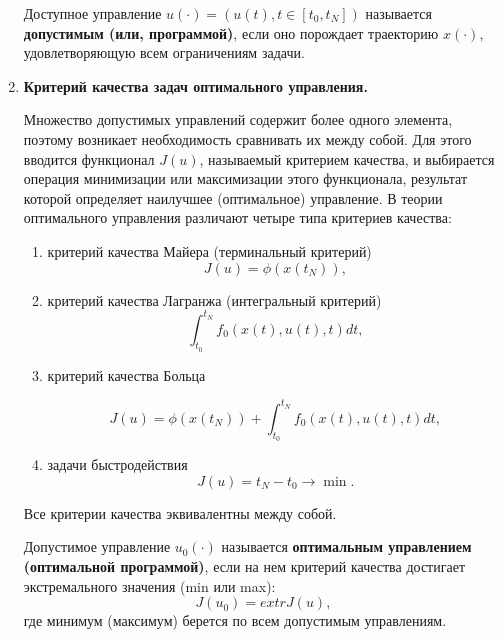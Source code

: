 \begin{enumerate}
Доступное управление $u(·) = (u(t), t \in [t_0 , t_N ])$ называется \textbf{допустимым (или, программой)}, если оно порождает траекторию $x(·)$, удовлетворяющую всем ограничениям задачи.
    
    
    \item \textbf{Критерий качества задач оптимального управления.}

 Множество допустимых управлений  содержит более одного элемента, поэтому возникает необходимость сравнивать их между собой. Для этого вводится функционал $J(u)$, называемый критерием качества, и выбирается операция минимизации или максимизации этого функционала, результат которой определяет наилучшее (оптимальное) управление. В теории оптимального управления различают четыре типа критериев качества:
\begin{enumerate}
    \item критерий качества Майера (терминальный критерий)
    \begin{equation} \label{eq_op:Mayers} J(u) = \phi(x(t_N)),
    \end{equation}
    \item критерий качества Лагранжа (интегральный критерий)
    \begin{equation} \label{eq_op:Lagranzh} \int_{t_0}^{t_N}f_0(x(t),u(t),t)dt,
    \end{equation}
    \item критерий качества Больца
    
    \begin{equation} \label{eq_op:Bolc} J(u) = \phi(x(t_N)) + \int_{t_0}^{t_N}f_0(x(t),u(t),t)dt,
    \end{equation}
    \item задачи быстродействия
    \begin{equation} \label{eq_op:Bystr}J(u)=t_N - t_0 \rightarrow \min.
    \end{equation}
\end{enumerate}
Все критерии качества эквивалентны между собой.

Допустимое управление $u_0 (·)$ называется \textbf{оптимальным управлением (оптимальной программой)}, если на нем критерий качества достигает экстремального значения (min или max): $$J(u_0) = extr J(u),$$
где минимум (максимум) берется по всем допустимым управлениям.

\end{enumerate}



